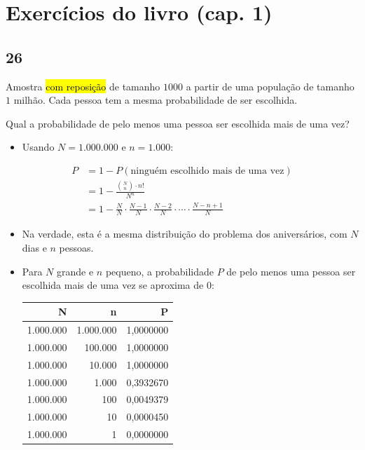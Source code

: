 \documentclass[
  11pt]{report}
\providecommand{\tightlist}{%
  \setlength{\itemsep}{0pt}\setlength{\parskip}{0pt}}
\begin{document}
\hypertarget{exercuxedcios-do-livro-cap.-1-1}{%
\section*{Exercícios do livro (cap. 1)}\label{exercuxedcios-do-livro-cap.-1-1}}

\hypertarget{section-3}{%
\subsection*{26}\label{section-3}}

\begin{rmdbox}
Amostra {\hl{com reposição}} de tamanho $1000$ a partir de uma população de tamanho $1$ milhão. Cada pessoa tem a mesma probabilidade de ser escolhida.

Qual a probabilidade de pelo menos uma pessoa ser escolhida mais de uma vez?

\end{rmdbox}

\begin{itemize}
\tightlist
\item
  Usando $N = 1.000.000$ e $n = 1.000$:
\end{itemize}

\[
\begin{aligned}
P &= 1 - P(\text{ninguém escolhido mais de uma vez}) \\
  &= 1 - \frac{\binom{N}{n} \cdot n!}{N^n} \\
  &= 1 - \frac{N}{N} \cdot \frac{N - 1}{N} \cdot \frac{N - 2}{N} \cdot \cdots \cdot \frac{N - n + 1}{N}
\end{aligned}
\]

\begin{itemize}
\item
  Na verdade, esta é a mesma distribuição do problema dos aniversários, com $N$ dias e $n$ pessoas.
\item
  Para $N$ grande e $n$ pequeno, a probabilidade $P$ de pelo menos uma pessoa ser escolhida mais de uma vez se aproxima de $0$:

  \begin{table}
  \centering
  \begin{tabular}[t]{r|r|r}
  \hline
  N & n & P\\
  \hline
  1.000.000 & 1.000.000 & 1,0000000\\
  \hline
  1.000.000 & 100.000 & 1,0000000\\
  \hline
  1.000.000 & 10.000 & 1,0000000\\
  \hline
  1.000.000 & 1.000 & 0,3932670\\
  \hline
  1.000.000 & 100 & 0,0049379\\
  \hline
  1.000.000 & 10 & 0,0000450\\
  \hline
  1.000.000 & 1 & 0,0000000\\
  \hline
  \end{tabular}
  \end{table}
\end{itemize}
\end{document}
